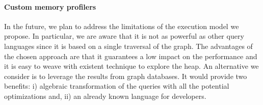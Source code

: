 \paragraph{Custom memory profilers}
In the future, we plan to address the limitations of the execution model we propose.
In particular, we are aware that it is not as powerful as other query languages since it is based on a single traversal of the graph.
The advantages of the chosen approach are that it guarantees a low impact on the performance and it is easy to weave with existent technique to explore the heap.
An alternative we consider is to leverage the results from graph databases.
It would provide two benefits: i) algebraic transformation of the queries with all the potential optimizations and, ii) an already known language for developers.

\begin{comment}

\subsection{Transfert du monde académique vers l'industrie }
Les travaux présentés dans cette thèse se sont fait dans le cadre d'un financement CIFRE (Convention Industrielle de Formation par la Recherche). Une partie transfert vers l'industrie reste à effectuer. Nous envisageons d'industrialiser les développements tout en conservant une interaction avec le domaine de la recherche. Cette industrialisation passera par le développement d'un produit logiciel utilisable pour modéliser la variabilité et sélectionner les configuration de tests. Puis de déployer les solutions proposées sur des projets pilotes comme le test d'applications mobiles ou les applications testées doivent s’exécuter sur un large panel de téléphone mobile, puis chez des clients.

Les nombreux travaux de recherche en cours autour de la variabilité, comme le \textit{reverse engineering} de modèle de \textit{features}, répondent à des problématiques concrètes des industriels. La poursuite de ce partenariat académie-industrie serait bénéfique pour les deux parties. D'un coté, la fourniture de cas concret industriels aux chercheurs permet d'alimenter les thématiques de recherches et contribue d'autre part à la présentation de solutions innovantes pour l'entreprise.
\end{comment}